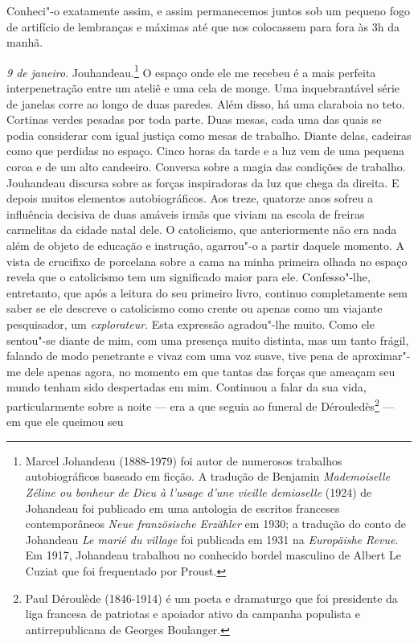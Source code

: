 Conheci"-o exatamente assim, e assim permanecemos juntos sob um pequeno
fogo de artifício de lembranças e máximas até que nos colocassem para
fora às 3h da manhã.

\emph{9 de janeiro}. Jouhandeau.\footnote{Marcel Johandeau
  (1888-1979) foi autor de numerosos trabalhos autobiográficos baseado
  em ficção. A tradução de Benjamin \emph{Mademoiselle Zéline ou bonheur
  de Dieu à l'usage d'une vieille demioselle} (1924) de Johandeau foi
  publicado em uma antologia de escritos franceses contemporâneos
  \emph{Neue französische Erzähler} em 1930; a tradução do conto de
  Johandeau \emph{Le marié du village} foi publicada em 1931 na
  \emph{Europäishe Revue}. Em 1917, Johandeau trabalhou no conhecido
  bordel masculino de Albert Le Cuziat que foi frequentado por Proust. \versal{[N. E.]}}
O espaço onde ele me recebeu é a mais perfeita interpenetração entre um
ateliê e uma cela de monge. Uma inquebrantável série de janelas corre ao
longo de duas paredes. Além disso, há uma claraboia no teto. Cortinas
verdes pesadas por toda parte. Duas mesas, cada uma das quais se podia
considerar com igual justiça como mesas de trabalho. Diante delas,
cadeiras como que perdidas no espaço. Cinco horas da tarde e a luz vem
de uma pequena coroa e de um alto candeeiro. Conversa sobre a magia das
condições de trabalho. Jouhandeau discursa sobre as forças inspiradoras
da luz que chega da direita. E depois muitos elementos autobiográficos.
Aos treze, quatorze anos sofreu a influência decisiva de duas amáveis
irmãs que viviam na escola de freiras carmelitas da cidade natal dele. O
catolicismo, que anteriormente não era nada além de objeto de educação e
instrução, agarrou"-o a partir daquele momento. A vista de crucifixo de
porcelana sobre a cama na minha primeira olhada no espaço revela que o
catolicismo tem um significado maior para ele. Confesso"-lhe, entretanto,
que após a leitura do seu primeiro livro, continuo completamente sem
saber se ele descreve o catolicismo como crente ou apenas como um
viajante pesquisador, um \emph{explorateur}. Esta expressão agradou"-lhe
muito. Como ele sentou"-se diante de mim, com uma presença muito
distinta, mas um tanto frágil, falando de modo penetrante e vivaz com
uma voz suave, tive pena de aproximar"-me dele apenas agora, no momento
em que tantas das forças que ameaçam seu mundo tenham sido despertadas
em mim. Continuou a falar da sua vida, particularmente sobre a noite ---
era a que seguia ao funeral de Dérouledès\footnote{Paul Déroulède
  (1846-1914) é um poeta e dramaturgo que foi presidente da liga
  francesa de patriotas e apoiador ativo da campanha populista e
  antirrepublicana de Georges Boulanger. \versal{[N. E.]}} --- em que ele queimou seu
